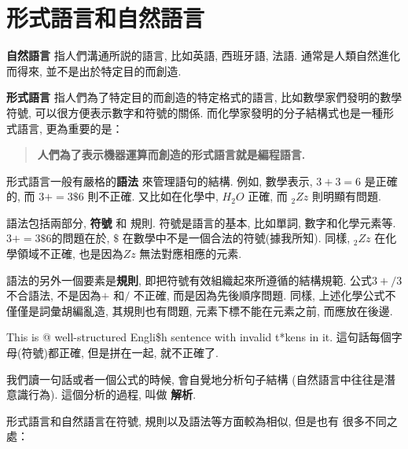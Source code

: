 \documentclass[10pt]{book}
\begin{document}



\section{形式語言和自然語言}

{\bf 自然語言} 指人們溝通所説的語言, 比如英語, 西班牙語, 法語. 
通常是人類自然進化而得來, 並不是出於特定目的而創造. 


{\bf 形式語言} 指人們為了特定目的而創造的特定格式的語言, 
比如數學家們發明的數學符號, 
可以很方便表示數字和符號的關係. 
而化學家發明的分子結構式也是一種形式語言, 更為重要的是：

\begin{quote}
{\bf 人們為了表示機器運算而創造的形式語言就是編程語言. }
\end{quote}

形式語言一般有嚴格的{\bf 語法} 來管理語句的結構. 例如, 
數學表示, $3 + 3 = 6$ 是正確的, 而 $3 + = 3 \$ 6$ 則不正確. 
又比如在化學中, $H_2O$ 正確, 而 $_2Zz$ 則明顯有問題. 

語法包括兩部分, {\bf 符號} 和 規則. 
符號是語言的基本, 比如單詞, 數字和化學元素等. 
$3 += 3 \$ 6$的問題在於, \(\$\) 在數學中不是一個合法的符號(據我所知). 
同樣, $_2Zz$ 在化學領域不正確, 也是因為$Zz$ 無法對應相應的元素. 

語法的另外一個要素是{\bf 規則}, 即把符號有效組織起來所遵循的結構規範. 
公式$3 +/ 3$ 不合語法, 不是因為$+$ 和$/$ 不正確, 而是因為先後順序問題. 
同樣, 上述化學公式不僅僅是詞彙胡編亂造, 其規則也有問題, 元素下標不能在元素之前, 
而應放在後邊. 

This is @ well-structured Engli\$h
sentence with invalid t*kens in it. 這句話每個字母(符號)都正確, 
但是拼在一起, 就不正確了. 

我們讀一句話或者一個公式的時候, 會自覺地分析句子結構
(自然語言中往往是潛意識行為). 這個分析的過程, 叫做 {\bf 解析}. 

形式語言和自然語言在符號, 規則以及語法等方面較為相似, 但是也有
很多不同之處：
\end{document}

